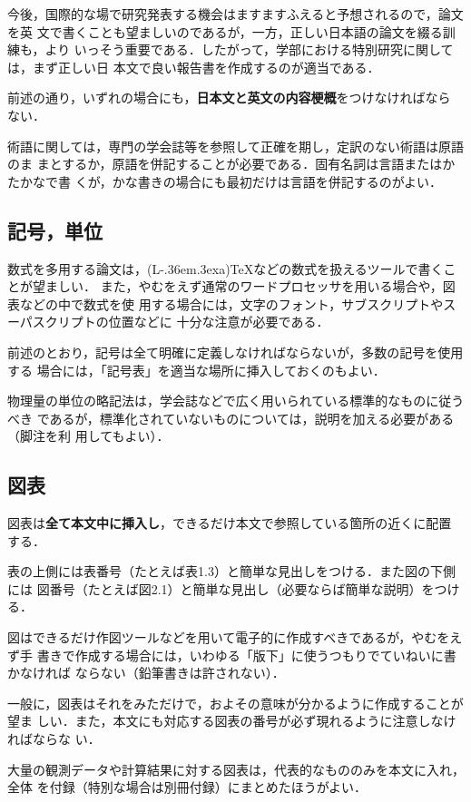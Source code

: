 \documentclass[master]{kuisthesis}		%
\def\LATEX{{\rm (L\kern-.36em\raise.3ex\hbox{\sc a})\TeX}}
\let\EM\bf
\begin{document}
今後，国際的な場で研究発表する機会はますますふえると予想されるので，論文を英
文で書くことも望ましいのであるが，一方，正しい日本語の論文を綴る訓練も，より
いっそう重要である．したがって，学部における特別研究に関しては，まず正しい日
本文で良い報告書を作成するのが適当である．

前述の通り，いずれの場合にも，{\EM 日本文と英文の内容梗概}をつけなければなら
ない．

術語に関しては，専門の学会誌等を参照して正確を期し，定訳のない術語は原語のま
まとするか，原語を併記することが必要である．固有名詞は言語またはかたかなで書
くが，かな書きの場合にも最初だけは言語を併記するのがよい．

\subsection{記号，単位}\label{subsec-symbol}
数式を多用する論文は，\LATEX などの数式を扱えるツールで書くことが望ましい．
また，やむをえず通常のワードプロセッサを用いる場合や，図表などの中で数式を使
用する場合には，文字のフォント，サブスクリプトやスーパスクリプトの位置などに
十分な注意が必要である．

前述のとおり，記号は全て明確に定義しなければならないが，多数の記号を使用する
場合には，「記号表」を適当な場所に挿入しておくのもよい．

物理量の単位の略記法は，学会誌などで広く用いられている標準的なものに従うべき
であるが，標準化されていないものについては，説明を加える必要がある（脚注を利
用してもよい）．

\subsection{図表}\label{subsec-figure}
図表は{\EM 全て本文中に挿入し}，できるだけ本文で参照している箇所の近くに配置
する．

表の上側には表番号（たとえば表1.3）と簡単な見出しをつける．また図の下側には
図番号（たとえば図2.1）と簡単な見出し（必要ならば簡単な説明）をつける．

図はできるだけ作図ツールなどを用いて電子的に作成すべきであるが，やむをえず手
書きで作成する場合には，いわゆる「版下」に使うつもりでていねいに書かなければ
ならない（鉛筆書きは許されない）．

一般に，図表はそれをみただけで，およその意味が分かるように作成することが望ま
しい．また，本文にも対応する図表の番号が必ず現れるように注意しなければならな
い．

大量の観測データや計算結果に対する図表は，代表的なもののみを本文に入れ，全体
を付録（特別な場合は別冊付録）にまとめたほうがよい．
\end{document}
